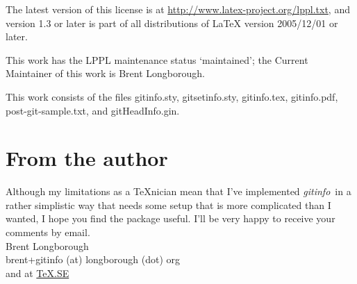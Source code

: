\documentclass[a4paper,12pt,twoside,openany]{memoir}
\newcommand{\sfit}[1]{\textit{#1}}
\newcommand{\tpname}{\sfit{gitinfo}}
\newcommand{\ginname}{gitHeadInfo.gin}
\begin{document}
The latest version of this license is at
\url{http://www.latex-project.org/lppl.txt},
and version 1.3 or later is part of all distributions of \LaTeX
version 2005/12/01 or later.

This work has the LPPL maintenance status `maintained';
the Current Maintainer of this work is Brent Longborough.

This work consists of the files 
gitinfo.sty, gitsetinfo.sty, gitinfo.tex, gitinfo.pdf,
post-git-sample.txt, and \ginname.
\section{From the author}
Although my limitations as a \TeX nician
mean that I've implemented \tpname\ in a rather simplistic way
that needs some setup that is more complicated than I wanted,
I hope you find the package useful.
I'll be very happy to receive your comments by email.\\[\baselineskip]
Brent Longborough\\[\baselineskip]
\textsf{brent+gitinfo (at) longborough (dot) org}\\
and at \href{http://tex.stackexchange.com/users/344/brent-longborough}{\TeX.SE}
\end{document}
